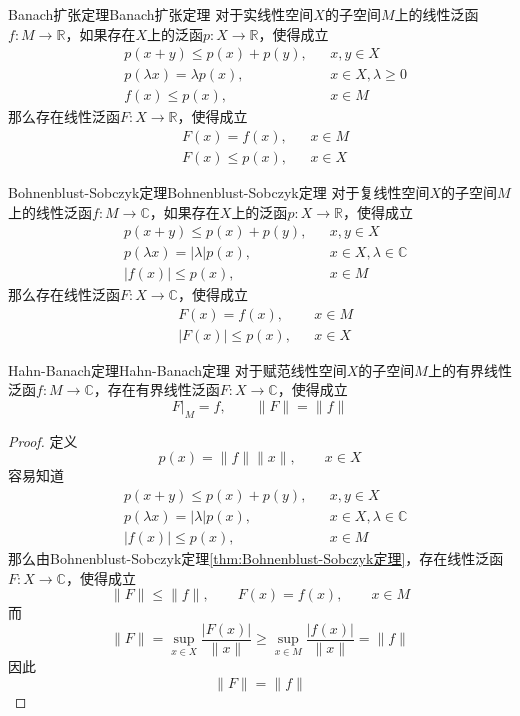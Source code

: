 \documentclass[lang = cn, scheme = chinese, thmcnt = section]{elegantbook}
\newcommand{\R}{\mathbb{R}}            %
\newcommand{\C}{\mathbb{C}}  		   %
\begin{document}
\begin{theorem}{Banach扩张定理}{Banach扩张定理}
	对于实线性空间$X$的子空间$M$上的线性泛函$f:M\to \R$，如果存在$X$上的泛函$p:X\to \R$，使得成立
	\begin{align*}
		&p(x+y)\le p(x)+p(y),&& x,y\in X\\
		&p(\lambda x)=\lambda p(x),&& x\in X,\lambda\ge 0\\
		&f(x)\le p(x),&& x\in M
	\end{align*}
	那么存在线性泛函$F:X\to\R$，使得成立
	\begin{align*}
		& F(x)=f(x),&& x\in M\\
		& F(x)\le p(x),&& x\in X
	\end{align*}
\end{theorem}

\begin{theorem}{Bohnenblust-Sobczyk定理}{Bohnenblust-Sobczyk定理}
	对于复线性空间$X$的子空间$M$上的线性泛函$f:M\to \C$，如果存在$X$上的泛函$p:X\to \R$，使得成立
	\begin{align*}
		&p(x+y)\le p(x)+p(y),&& x,y\in X\\
		&p(\lambda x)=|\lambda| p(x),&& x\in X,\lambda\in \C\\
		&|f(x)|\le p(x),&& x\in M
	\end{align*}
	那么存在线性泛函$F:X\to\C$，使得成立
	\begin{align*}
		& F(x)=f(x),&& x\in M\\
		& |F(x)|\le p(x),&& x\in X
	\end{align*}
\end{theorem}

\begin{theorem}{Hahn-Banach定理}{Hahn-Banach定理}
	对于赋范线性空间$X$的子空间$M$上的有界线性泛函$f:M\to\C$，存在有界线性泛函$F:X\to\C$，使得成立
	$$
	F|_M=f,\qquad 
	\|F\|=\|f\|
	$$
\end{theorem}

\begin{proof}
	定义
	$$
	p(x)=\|f\|\|x\|,\qquad x\in X
	$$
	容易知道
	\begin{align*}
		&p(x+y)\le p(x)+p(y),&& x,y\in X\\
		&p(\lambda x)=|\lambda| p(x),&& x\in X,\lambda\in \C\\
		&|f(x)|\le p(x),&& x\in M
	\end{align*}
	那么由Bohnenblust-Sobczyk定理\ref{thm:Bohnenblust-Sobczyk定理}，存在线性泛函$F:X\to\C$​，使得成立
	$$
	\|F\|\le\|f\|,\qquad F(x)=f(x),\qquad  x\in M
	$$
	而
	$$
	\|F\|=\sup_{x\in X}\frac{|F(x)|}{\|x\|}\ge \sup_{x\in M}\frac{|f(x)|}{\|x\|}=\|f\|
	$$
	因此
	$$
	\|F\|=\|f\|
	$$
\end{proof}
\end{document}
